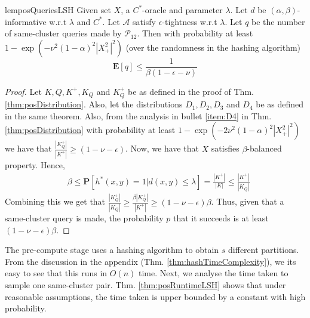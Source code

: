 \documentclass[12pt]{article}
\newcommand{\mb}{\mathbf}
\newcommand{\mc}{\mathcal}
\begin{document}
\begin{restatable}{lem}{posQueriesLSH}
\label{lemma:posQueriesLSH}
Given set $X$, a $C^*$-oracle and parameter $\lambda$. Let $d$ be $(\alpha, \beta)$-informative w.r.t $\lambda$ and $C^*$. Let $\mc A$ satisfy $\epsilon$-tightness w.r.t $\lambda$. Let $q$ be the number of same-cluster queries made by $\mc P_{12}$. Then with probability at least $1-\exp(-\nu^2(1-\alpha)^2|X^2_+|^2)$ (over the randomness in the hashing algorithm) $$\mb E[q] \le \frac{1}{\beta(1-\epsilon-\nu)}$$ 
\end{restatable}
\begin{proof}
Let $K, Q, K^+, K_Q$ and $K_Q^+$ be as defined in the proof of Thm. \ref{thm:posDistribution}. Also, let the distributions $D_1, D_2, D_3$ and $D_4$ be as defined in the same theorem. Also, from the analysis in bullet \ref{item:D4} in Thm. \ref{thm:posDistribution} with probability at least $1 - \exp(-2\nu^2(1-\alpha)^2|X^2_+|^2)$ we have that $\frac{|K_Q^+|}{|K^+|} \ge (1-\nu-\epsilon)$. Now, we have that $X$ satisfies $\beta$-balanced property. Hence,
\begin{align*}
  &\beta \le \mb P[h^*(x, y) = 1 | d(x, y) \le \lambda] = \frac{|K^+|}{|K|} \le \frac{|K^+|}{|K_Q|}
\end{align*}
Combining this we get that $\frac{|K_Q^+|}{|K_Q|} \ge \frac{\beta|K_Q^+|}{|K^+|} \ge (1-\nu-\epsilon)\beta$. Thus, given that a same-cluster query is made, the probability $p$ that it succeeds is at least $(1-\nu-\epsilon)\beta$.
\end{proof}

The pre-compute stage uses a hashing algorithm to obtain $s$ different partitions. From the discussion in the appendix (Thm. \ref{thm:hashTimeComplexity}), we its easy to see that this runs in $O(n)$ time. Next, we  analyse the time taken to sample one same-cluster pair.  Thm. \ref{thm:posRuntimeLSH} shows that under reasonable assumptions, the time taken is upper bounded by a constant with high probability. 
\end{document}
